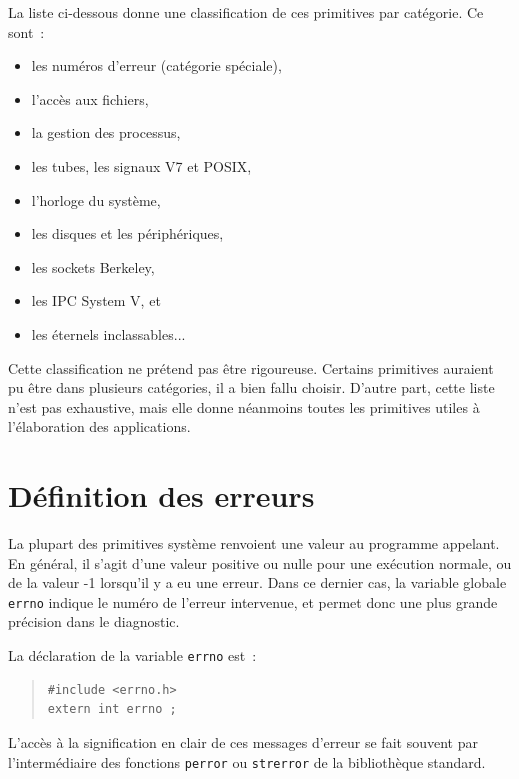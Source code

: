 \documentclass [twoside] {report}
\begin{document}
La liste ci-dessous donne une classification de
ces primitives par catégorie. Ce sont~:

\begin {itemize}
    \item les numéros d'erreur (catégorie spéciale),
    \item l'accès aux fichiers,
    \item la gestion des processus,
    \item les tubes, les signaux V7 et POSIX,
    \item l'horloge du système,
    \item les disques et les périphériques,
    \item les sockets Berkeley,
    \item les IPC System V, et
    \item les éternels inclassables...
\end {itemize}

Cette classification ne prétend pas être
rigoureuse. Certains primitives auraient pu être dans
plusieurs catégories, il a bien fallu choisir.
D'autre part, cette liste n'est pas exhaustive,
mais elle donne néanmoins toutes les primitives
utiles à l'élaboration des applications.




\section {Définition des erreurs}


La plupart des primitives système renvoient une valeur au programme
appelant. En général, il s'agit d'une valeur
positive ou nulle pour une exécution normale, ou
de la valeur -1 lorsqu'il y a eu une erreur. Dans
ce dernier cas, la variable globale \texttt {errno}
indique le numéro de l'erreur intervenue, et
permet donc une plus grande précision dans le
diagnostic.

La déclaration de la variable \texttt {errno} est~:

\begin {quote}
\begin {verbatim}
#include <errno.h>
extern int errno ;
\end{verbatim}
\end {quote}

L'accès à la signification en clair de ces
messages d'erreur se fait souvent par
l'intermédiaire des fonctions \texttt {perror}
ou \texttt {strerror} de la
bibliothèque standard.
\end{document}
